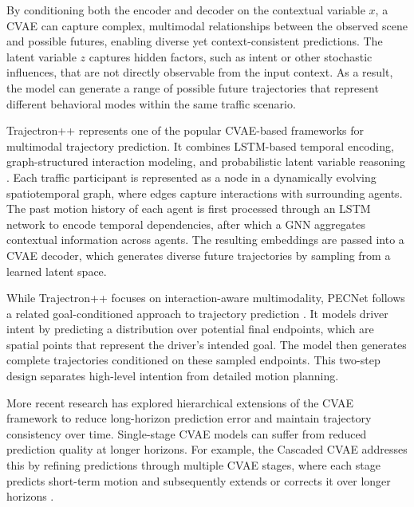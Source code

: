 \par By conditioning both the encoder and decoder on the contextual variable \(x\), a \ac{CVAE} can capture
complex, multimodal relationships between the observed scene and possible futures, enabling diverse yet context-consistent
predictions. The latent variable \(z\) captures hidden factors, such as intent or other stochastic influences, that
are not directly observable from the input context. As a result, the model can generate a range of possible future
trajectories that represent different behavioral modes within the same traffic scenario.

\par Trajectron++ represents one of the popular \ac{CVAE}-based frameworks for multimodal trajectory prediction. 
It combines \ac{LSTM}-based temporal encoding, graph-structured interaction modeling, and probabilistic
latent variable reasoning \cite{salzmann2021trajectrondynamicallyfeasibletrajectoryforecasting}. 
Each traffic participant is represented as a node in a dynamically
evolving spatiotemporal graph, where edges capture interactions with surrounding agents. The past motion
history of each agent is first processed through an \ac{LSTM} network to encode temporal dependencies,
after which a \ac{GNN} aggregates contextual information across agents. The resulting embeddings are passed
into a \ac{CVAE} decoder, which generates diverse future trajectories by sampling from a learned latent space.

\par While Trajectron++ focuses on interaction-aware multimodality, \ac{PECNet} 
follows a related goal-conditioned approach to trajectory prediction \cite{mangalam2020journeydestinationendpointconditioned}. 
It models
driver intent by predicting a distribution over potential final endpoints, which are spatial points that
represent the driver’s intended goal. The model then generates complete trajectories conditioned on these
sampled endpoints. This two-step design separates high-level intention from detailed motion planning.

\par More recent research has explored hierarchical extensions of the \ac{CVAE} framework to reduce long-horizon
prediction error and maintain trajectory consistency over time. Single-stage \ac{CVAE} models can suffer from
reduced prediction quality at longer horizons. For example, the Cascaded \ac{CVAE} addresses this by
refining predictions through multiple \ac{CVAE} stages, where each stage predicts short-term motion and
subsequently extends or corrects it over longer horizons \cite{ZHOU2023109030}.

